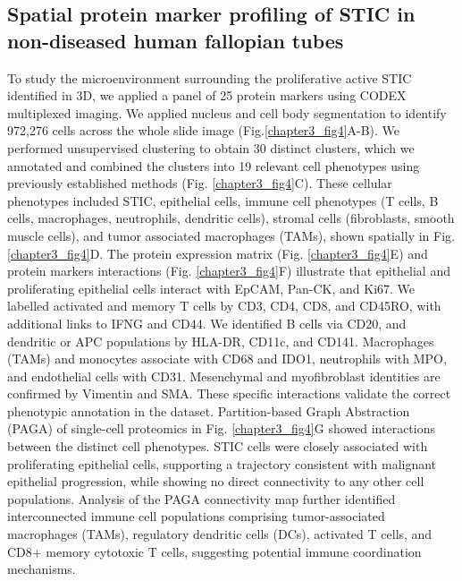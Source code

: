 \begin{refsection}
    \subsection{Spatial protein marker profiling of STIC in non-diseased human fallopian tubes}
    To study the microenvironment surrounding the proliferative active STIC identified in 3D, we applied a panel of 25 protein markers using CODEX multiplexed imaging. We applied nucleus and cell body segmentation to identify 972,276 cells across the whole slide image (Fig.\ref{chapter3_fig4}A-B)\cite{Schmidt2018Cell}. We performed unsupervised clustering to obtain 30 distinct clusters, which we annotated and combined the clusters into 19 relevant cell phenotypes using previously established methods (Fig. \ref{chapter3_fig4}C)\cite{Squidpy,Wolf2018SCANPY,Virshup2021anndata}. These cellular phenotypes included STIC, epithelial cells, immune cell phenotypes (T cells, B cells, macrophages, neutrophils, dendritic cells), stromal cells (fibroblasts, smooth muscle cells), and tumor associated macrophages (TAMs), shown spatially in Fig. \ref{chapter3_fig4}D. The protein expression matrix (Fig. \ref{chapter3_fig4}E) and protein markers interactions\cite{Krzywinski2009Circos} (Fig. \ref{chapter3_fig4}F) illustrate that epithelial and proliferating epithelial cells interact with EpCAM, Pan-CK, and Ki67. We labelled activated and memory T cells by CD3, CD4, CD8, and CD45RO, with additional links to IFNG and CD44. We identified B cells via CD20, and dendritic or APC populations by HLA-DR, CD11c, and CD141. Macrophages (TAMs) and monocytes associate with CD68 and IDO1, neutrophils with MPO, and endothelial cells with CD31. Mesenchymal and myofibroblast identities are confirmed by Vimentin and SMA. These specific interactions validate the correct phenotypic annotation in the dataset.
    Partition-based Graph Abstraction (PAGA) of single-cell proteomics in Fig. \ref{chapter3_fig4}G\cite{Wolf2019PAGA} showed interactions between the distinct cell phenotypes. STIC cells were closely associated with proliferating epithelial cells, supporting a trajectory consistent with malignant epithelial progression, while showing no direct connectivity to any other cell populations. Analysis of the PAGA connectivity map further identified interconnected immune cell populations comprising tumor-associated macrophages (TAMs), regulatory dendritic cells (DCs), activated T cells, and CD8+ memory cytotoxic T cells, suggesting potential immune coordination mechanisms. 

\end{refsection}
